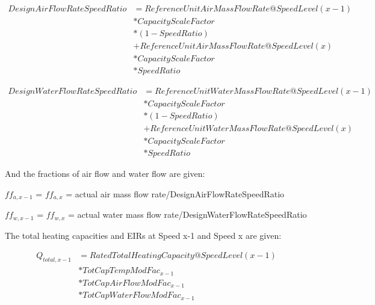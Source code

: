 \begin{equation}
  \begin{array}{rl}
  DesignAirFlowRateSpeedRatio &= ReferenceUnitAirMassFlowRate@SpeedLevel\left( {x - 1} \right) \\
                              &* CapacityScaleFactor \\
                              &* \left(1-SpeedRatio\right) \\
                              &+ ReferenceUnitAirMassFlowRate@SpeedLevel\left( x \right) \\
                              &* CapacityScaleFactor \\
                              &* SpeedRatio
  \end{array}
\end{equation}

\begin{equation}
  \begin{array}{rl}
    DesignWaterFlowRateSpeedRatio &= ReferenceUnitWaterMassFlowRate@SpeedLevel\left( {x - 1} \right) \\
                                  &* CapacityScaleFactor \\
                                  &* \left(1-SpeedRatio\right) \\
                                  &+ ReferenceUnitWaterMassFlowRate@SpeedLevel\left( x \right) \\
                                  &* CapacityScaleFactor \\
                                  &* SpeedRatio
  \end{array}
\end{equation}

And the fractions of air flow and water flow are given:

\(f{f_{a,x - 1}}\) = \(f{f_{a,x}}\) = actual air mass flow rate/DesignAirFlowRateSpeedRatio

\(f{f_{w,x - 1}}\) = \(f{f_{w,x}}\) = actual water mass flow rate/DesignWaterFlowRateSpeedRatio

The total heating capacities and EIRs at Speed x-1 and Speed x are given:

\begin{equation}
  \begin{array}{rl}
    Q_{total,x - 1} &= RatedTotalHeatingCapacity@SpeedLevel\left( {x - 1} \right) \\
                    &* TotCapTempModFac_{x - 1} \\
                    &* TotCapAirFlowModFac_{x - 1} \\
                    &* TotCapWaterFlowModFac_{x - 1}
  \end{array}
\end{equation}


